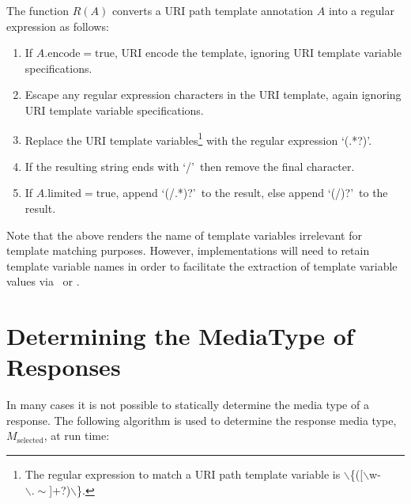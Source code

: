 The function $R(A)$ converts a URI path template annotation $A$ into a regular expression as follows:
\begin{enumerate}
\item If $A.\mbox{encode}=\mbox{true}$, URI encode the template, ignoring URI template variable specifications.
\item Escape any regular expression characters in the URI template, again ignoring URI template variable specifications.
\item Replace the URI template variables\footnote{The regular expression to match a URI path template variable is $\backslash$\{([$\backslash$w-$\backslash.\sim$]+?)$\backslash$\}.} with the regular expression \lq(.*?)\rq.
\item If the resulting string ends with \lq/\rq\ then remove the final character.
\item If $A.\mbox{limited}=\mbox{true}$, append \lq(/.*)?\rq\ to the result, else append \lq(/)?\rq\ to the result.
\end{enumerate}

Note that the above renders the name of template variables irrelevant for template matching purposes. However, implementations will need to retain template variable names in order to facilitate the extraction of template variable values via \PathParam\ or \UriInfo{}.

\section{Determining the MediaType of Responses}

In many cases it is not possible to statically determine the media type of a response. The following algorithm is used to determine the response media type, $M_{\mbox{selected}}$, at run time:

